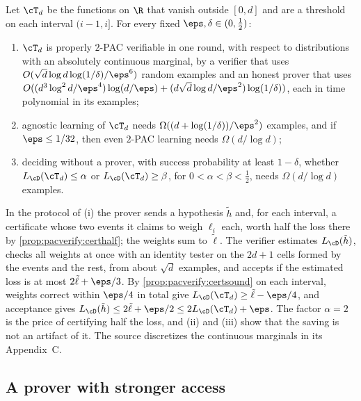 \begin{refsection}
\begin{theorem}\label{thm:pacverify:multithreshold}
Let $\cT_d$ be the functions on $\R$ that vanish outside $[0,d]$ and are a threshold on each interval $(i-1,i]$. For every fixed $\eps,\delta\in(0,\frac12)$:
\begin{enumerate}
\item $\cT_d$ is properly $2$-PAC verifiable in one round, with respect to distributions with an absolutely continuous marginal, by a verifier that uses $O(\sqrt d\log d\log(1/\delta)/\eps^6)$ random examples and an honest prover that uses $O((d^3\log^2d/\eps^4)\log(d/\eps)+(d\sqrt d\log d/\eps^2)\log(1/\delta))$, each in time polynomial in its examples;
\item agnostic learning of $\cT_d$ needs $\Omega((d+\log(1/\delta))/\eps^2)$ examples, and if $\eps\le1/32$, then even $2$-PAC learning needs $\Omega(d/\log d)$;
\item deciding without a prover, with success probability at least $1-\delta$, whether $L_\cD(\cT_d)\le\alpha$ or $L_\cD(\cT_d)\ge\beta$, for $0<\alpha<\beta<\frac12$, needs $\Omega(d/\log d)$ examples.
\end{enumerate}
\end{theorem}

In the protocol of (i) the prover sends a hypothesis $\tilde h$ and, for each interval, a certificate whose two events it claims to weigh $\ell_i$ each, worth half the loss there by \cref{prop:pacverify:certhalf}; the weights sum to $\tilde\ell$. The verifier estimates $L_\cD(\tilde h)$, checks all weights at once with an identity tester on the $2d+1$ cells formed by the events and the rest, from about $\sqrt d$ examples, and accepts if the estimated loss is at most $2\tilde\ell+\eps/3$. By \cref{prop:pacverify:certsound} on each interval, weights correct within $\eps/4$ in total give $L_\cD(\cT_d)\ge\tilde\ell-\eps/4$, and acceptance gives $L_\cD(\tilde h)\le2\tilde\ell+\eps/2\le2L_\cD(\cT_d)+\eps$. The factor $\alpha=2$ is the price of certifying half the loss, and (ii) and (iii) show that the saving is not an artifact of it. The source discretizes the continuous marginals in its Appendix~C.

\subsection{A prover with stronger access}


\end{refsection}
